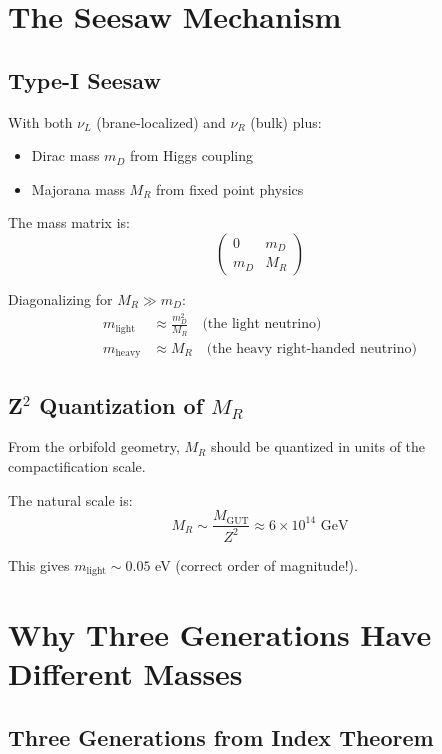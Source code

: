 \documentclass[12pt,a4paper]{article}
\begin{document}
\section{The Seesaw Mechanism}

\subsection{Type-I Seesaw}

With both $\nu_L$ (brane-localized) and $\nu_R$ (bulk) plus:
\begin{itemize}
\item Dirac mass $m_D$ from Higgs coupling
\item Majorana mass $M_R$ from fixed point physics
\end{itemize}

The mass matrix is:
\begin{equation}
\begin{pmatrix}
0 & m_D \\
m_D & M_R
\end{pmatrix}
\end{equation}

Diagonalizing for $M_R \gg m_D$:
\begin{align}
m_{\text{light}} &\approx \frac{m_D^2}{M_R} \quad \text{(the light neutrino)} \\
m_{\text{heavy}} &\approx M_R \quad \text{(the heavy right-handed neutrino)}
\end{align}

\subsection{Z$^2$ Quantization of $M_R$}

From the orbifold geometry, $M_R$ should be quantized in units of the compactification scale.

The natural scale is:
\begin{equation}
M_R \sim \frac{M_{\text{GUT}}}{Z^2} \approx 6 \times 10^{14} \text{ GeV}
\end{equation}

This gives $m_{\text{light}} \sim 0.05$ eV (correct order of magnitude!).

\section{Why Three Generations Have Different Masses}

\subsection{Three Generations from Index Theorem}
\end{document}
